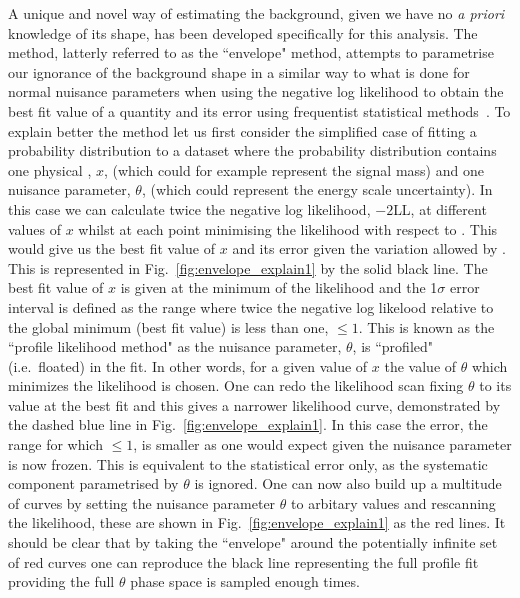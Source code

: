 A unique and novel way of estimating the background, given we have no \emph{a priori} knowledge of its shape, has been developed specifically for this analysis. The method, latterly referred to as the ``envelope" method, attempts to parametrise our ignorance of the background shape in a similar way to what is done for normal nuisance parameters when using the negative log likelihood to obtain the best fit value of a quantity and its error using frequentist statistical methods~\cite{FredJames}. To explain better the method let us first consider the simplified case of fitting a probability distribution to a dataset where the probability distribution contains one physical \POI, $x$, (which could for example represent the signal mass) and one nuisance parameter, $\theta$, (which could represent the energy scale uncertainty). In this case we can calculate twice the negative log likelihood, $-2$LL, at different values of $x$ whilst at each point minimising the likelihood with respect to \theta. 
This would give us the best fit value of $x$ and its error given the variation allowed by \theta. This is represented in Fig.~\ref{fig:envelope_explain1} by the solid black line. The best fit value of $x$ is given at the minimum of the likelihood and the 1$\sigma$ error interval is defined as the range where twice the negative log likelood relative to the global minimum (best fit value) is less than one, \NLL$\leq1$. This is known as the ``profile likelihood method" as the nuisance parameter, $\theta$, is ``profiled" (i.e.\ floated) in the fit. In other words, for a given value of $x$ the value of $\theta$ which minimizes the likelihood is chosen. One can redo the likelihood scan fixing $\theta$ to its value at the best fit and this gives a narrower likelihood curve, demonstrated by the dashed blue line in Fig.~\ref{fig:envelope_explain1}. In this case the error, the range for which \NLL$\leq1$, is smaller as one would expect given the nuisance parameter is now frozen. This is equivalent to the statistical error only, as the systematic component parametrised by $\theta$ is ignored. One can now also build up a multitude of curves by setting the nuisance parameter $\theta$ to arbitary values and rescanning the likelihood, these are shown in Fig.~\ref{fig:envelope_explain1} as the red lines. It should be clear that by taking the ``envelope" around the potentially infinite set of red curves one can reproduce the black line representing the full profile fit providing the full $\theta$ phase space is sampled enough times. 
